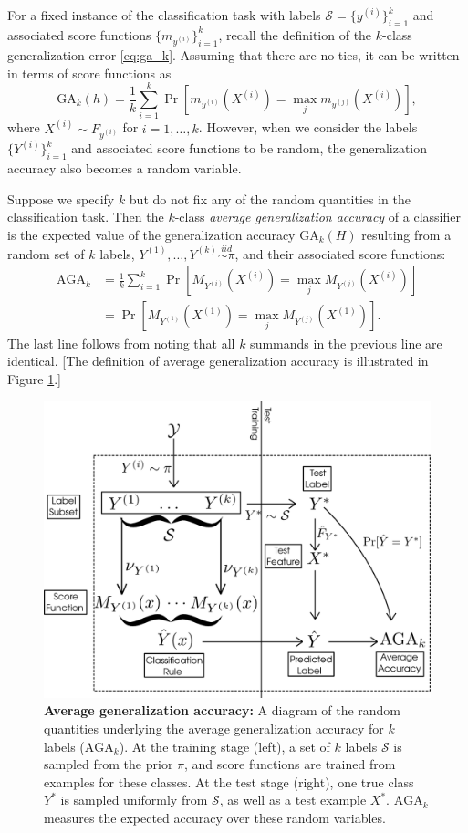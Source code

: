 \documentclass[twoside,11pt]{article}
\begin{document}
For a fixed instance of the classification task with labels
$\mathcal{S} = \{y^{(i)}\}_{i=1}^k$ and associated score functions
$\{m_{y^{(i)}}\}_{i=1}^k$, recall the definition of the $k$-class
generalization error \eqref{eq:ga_k}.  Assuming that there are no
ties, it can be written in terms of score functions as
\[
\text{GA}_k(h) = \frac{1}{k} \sum_{i=1}^k  \Pr[m_{y^{(i)}}(X^{(i)}) = \max_j
m_{y^{(j)}}(X^{(i)})],
\]
where $X^{(i)} \sim F_{y^{(i)}}$ for $i =1,\hdots, k$.  However, when
we consider the labels $\{Y^{(i)}\}_{i=1}^k$ and associated score
functions to be random, the generalization accuracy also becomes a
random variable.

Suppose we specify $k$ but do not fix any of the random quantities in
the classification task.  Then the $k$-class \emph{average
  generalization accuracy} of a classifier is the expected value of
the generalization accuracy $\text{GA}_k(H)$ resulting from a random
set of $k$ labels, $Y^{(1)}, \hdots, Y^{(k)} \stackrel{iid}{\sim
  \pi}$, and their associated score functions:
\begin{align*}
\text{AGA}_k &= \frac{1}{k} \sum_{i=1}^k \Pr[M_{Y^{(i)}}(X^{(i)}) = \max_j
M_{Y^{(j)}}(X^{(i)})]
\\&= \Pr[M_{Y^{(1)}}(X^{(1)}) = \max_j M_{Y^{(j)}}(X^{(1)})].
\end{align*}
The last line follows from noting that all $k$ summands in the
previous line are identical.  [The definition of average
  generalization accuracy is illustrated in Figure
  \ref{fig:average_risk}.]

\begin{figure}[h]
\centering
\includegraphics[scale = 0.3]{average_risk.png}
\caption{\textbf{Average generalization accuracy:} A diagram of the random quantities underlying the average generalization accuracy for $k$ labels ($\text{AGA}_k$). At the training stage (left), a set of $k$ labels $\mathcal{S}$ is sampled from the prior $\pi$, and score functions are trained from examples for these classes. At the test stage (right), one true class $Y^*$ is sampled uniformly from $\mathcal{S}$, as well as a test example $X^*$. $\text{AGA}_k$ measures the expected accuracy over these random variables.}\label{fig:average_risk}
\end{figure}
\end{document}
